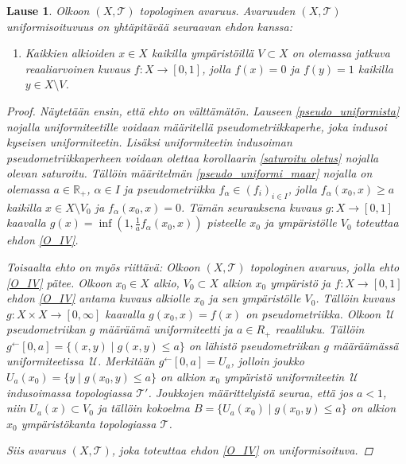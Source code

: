 \documentclass[12pt,a4paper,leqno]{report}
\newcommand{\R}{\mathbb{R}}
\newcommand{\U}{\,\mathcal{U}}
\newcommand{\T}{\mathcal{T}}
\theoremstyle{plain}
\newtheorem{lause}[equation]{Lause}
\theoremstyle{definition}
\theoremstyle{remark}
\begin{document}
\begin{lause}
Olkoon $(X,\T)$ topologinen avaruus.
Avaruuden $(X,\T)$ uniformisoituvuus on yhtäpitävää seuraavan ehdon kanssa:
\begin{enumerate} [label=(Z),ref=(Z)]
\item\label{O_IV} Kaikkien alkioiden $x\in X$ kaikilla 
ympäristöillä $V\subset X$ on olemassa jatkuva 
reaaliarvoinen kuvaus $f\colon X\rightarrow [0,1]$, 
jolla $f(x)=0$ ja $f(y)=1$ kaikilla $y\in X\setminus V$.
\end{enumerate}
\begin{proof}
Näytetään ensin, että ehto on välttämätön. 
Lauseen \ref{pseudo_uniformista} nojalla uniformiteetille voidaan 
määritellä pseudometriikkaperhe, joka indusoi kyseisen uniformiteetin. 
Lisäksi uniformiteetin indusoiman pseudometriikkaperheen voidaan olettaa korollaarin \ref{saturoitu oletus} 
nojalla olevan saturoitu. 
Tällöin määritelmän \ref{pseudo_uniformi_maar} nojalla on olemassa $ a\in\R_+$, $\alpha\in I$ 
ja pseudometriikka $f_\alpha\in (f_i)_{i\in I}$, 
jolla $f_\alpha (x_0,x)\geq a$ kaikilla $x\in X\setminus V_0$ ja $f_\alpha(x_0,x)=0$. 
Tämän seurauksena kuvaus $g\colon X\to [0,1]$ kaavalla $g(x)=\inf \left( 1,\frac{1}{a}f_\alpha(x_0,x) \right)$ 
pisteelle $x_0$ ja ympäristölle $V_0$ toteuttaa ehdon \ref{O_IV}.

Toisaalta ehto on myös riittävä:
Olkoon $(X,\T)$ topologinen avaruus, jolla ehto \ref{O_IV} pätee. 
Olkoon $x_0\in X$ alkio, $V_0\subset X$ alkion $x_0$ ympäristö 
ja $f\colon X\rightarrow [0,1]$ ehdon \ref{O_IV} antama kuvaus alkiolle $x_0$ ja sen ympäristölle $V_0$. 
Tällöin kuvaus $g\colon X\times X\to [0,\infty]$ kaavalla $g(x_0,x)=f(x)$ on pseudometriikka. 
Olkoon $\U$ pseudometriikan $g$ määräämä uniformiteetti ja 
$ a\in R_+$ reaaliluku. 
Tällöin $g^\leftarrow[0,a]=\{(x,y)\mid g(x,y)\leq a\}$ on 
lähistö pseudometriikan $g$ määräämässä uniformiteetissa $\U$. 
Merkitään $g^\leftarrow[0,a]=U_a$, jolloin  
joukko $U_a(x_0)=\{y\mid g(x_0,y)\leq a\}$ on alkion $x_0$ ympäristö uniformiteetin $\U$ 
indusoimassa topologiassa $\T'$. 
Joukkojen määrittelyistä seuraa, että jos $a<1$, niin $U_a(x)\subset V_0$ ja tällöin kokoelma $B=\{U_a(x_0)\mid g(x_0,y)\leq a\}$ 
on alkion $x_0$ ympäristökanta topologiassa $\T$.
%

Siis avaruus $(X,\T)$, joka toteuttaa ehdon \ref{O_IV} on uniformisoituva.
\end{proof}
\end{lause}
\end{document}
